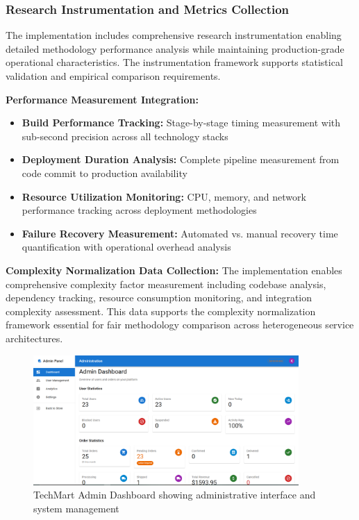 \subsubsection{Research Instrumentation and Metrics Collection}

The implementation includes comprehensive research instrumentation enabling detailed methodology performance analysis while maintaining production-grade operational characteristics. The instrumentation framework supports statistical validation and empirical comparison requirements.

\textbf{Performance Measurement Integration:}
\begin{itemize}
\item \textbf{Build Performance Tracking:} Stage-by-stage timing measurement with sub-second precision across all technology stacks
\item \textbf{Deployment Duration Analysis:} Complete pipeline measurement from code commit to production availability
\item \textbf{Resource Utilization Monitoring:} CPU, memory, and network performance tracking across deployment methodologies
\item \textbf{Failure Recovery Measurement:} Automated vs. manual recovery time quantification with operational overhead analysis
\end{itemize}

\textbf{Complexity Normalization Data Collection:}
The implementation enables comprehensive complexity factor measurement including codebase analysis, dependency tracking, resource consumption monitoring, and integration complexity assessment. This data supports the complexity normalization framework essential for fair methodology comparison across heterogeneous service architectures.

\begin{figure}[H]
\centering
\includegraphics[width=0.9\textwidth]{figures/chapter5/techmart-admin-dashboard.png}
\caption{TechMart Admin Dashboard showing administrative interface and system management}
\label{fig:techmart-admin-dashboard}
\end{figure}


